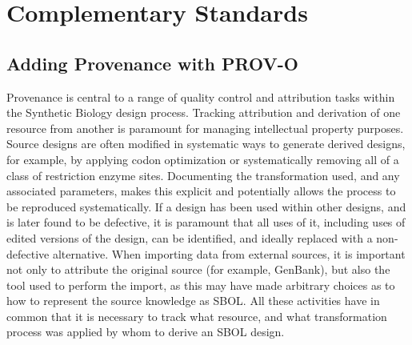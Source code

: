 \section{Complementary Standards}
\label{sec:complementaryStandards}
\subsection{Adding Provenance with PROV-O}
\label{sec:provenance}
\label{sec:wasGeneratedBys}


Provenance is central to a range of quality control and attribution tasks within the Synthetic Biology design process. Tracking attribution and derivation of one resource from another is paramount for managing intellectual property purposes. Source designs are often modified in systematic ways to generate derived designs, for example, by applying codon optimization or systematically removing all of a class of restriction enzyme sites.  Documenting the transformation used, and any associated parameters, makes this explicit and potentially allows the process to be reproduced systematically. If a design has been used within other designs, and is later found to be defective, it is paramount that all uses of it, including uses of edited versions of the design, can be identified, and ideally replaced with a non-defective alternative. When importing data from external sources, it is important not only to attribute the original source (for example, GenBank), but also the tool used to perform the import, as this may have made arbitrary choices as to how to represent the source knowledge as SBOL. All these activities have in common that it is necessary to track what resource, and what transformation process was applied by whom to derive an SBOL design.

